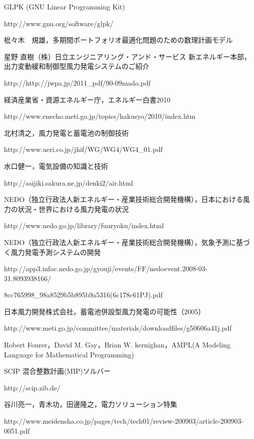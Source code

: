 \documentclass[a4paper,12pt,showkeys]{jreport}
\begin{document}
\begin{thebibliography}{17}



GLPK (GNU Linear Programming Kit)

http://www.gnu.org/software/glpk/

枇々木　規雄，多期間ポートフォリオ最適化問題のための数理計画モデル

星野 直樹（株）日立エンジニアリング・アンド・サービス 新エネルギー本部，出力変動緩和制御型風力発電システムのご紹介

http://http://jwpa.jp/2011\_pdf/90-09mado.pdf

経済産業省・資源エネルギー庁，エネルギー白書2010

http://www.enecho.meti.go.jp/topics/hakusyo/2010/index.htm

北村清之，風力発電と蓄電池の制御技術

http://www.ueri.co.jp/jhif/WG/WG4/WG4\_01.pdf

水口健一，電気設備の知識と技術

http://saijiki.sakura.ne.jp/denki2/air.html

NEDO（独立行政法人新エネルギー・産業技術総合開発機構），日本における風力の状況・世界における風力発電の状況

http://www.nedo.go.jp/library/fuuryoku/index.html

NEDO（独立行政法人新エネルギー・産業技術総合開発機構），気象予測に基づく風力発電予測システムの開発

http://app3.infoc.nedo.go.jp/gyouji/events/FF/nedoevent.2008-03-31.8093938166/

8cc765998\_98a8529b5b895b9a5316(6c178c61PJ).pdf

日本風力開発株式会社，蓄電池併設型風力発電の可能性（2005）

http://www.meti.go.jp/committee/materials/downloadfiles/g50606a41j.pdf

Robert Fourer，David M. Gay，Brian W. kernighan，AMPL(A Modeling Language for Mathematical Programming)

SCIP 混合整数計画(MIP)ソルバー

http://scip.zib.de/

谷川亮一，青木功，田邊隆之，電力ソリューション特集

http://www.meidensha.co.jp/pages/tech/tech01/review-200903/article-200903-0051.pdf


\end{thebibliography}
\end{document}
